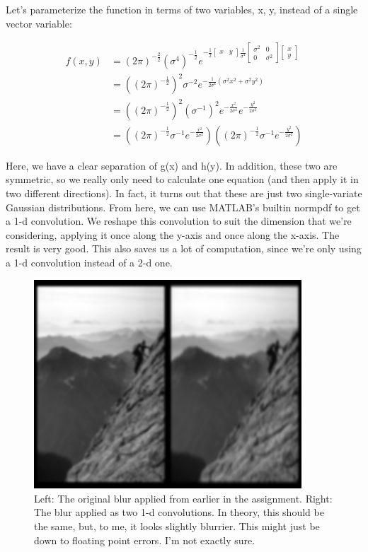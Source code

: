 \documentclass{article}
\begin{document}
Let's parameterize the function in terms of two variables, x, y, instead of a 
single vector variable:

\begin{align*}
f(x, y) &= (2 \pi)^{-\frac{2}{2}} (\sigma^4)^{-\frac{1}{2}} e^{-\frac{1}{2} \begin{bmatrix} x & y \end{bmatrix} \frac{1}{\sigma^4} \begin{bmatrix}
            \sigma^2 &        0 \\
                   0 & \sigma^2
        \end{bmatrix} \begin{bmatrix} x \\ y \end{bmatrix}} \\
        &= ((2 \pi)^{-\frac{1}{2}})^2 \sigma^{-2} e^{-\frac{1}{2 \sigma^4} (\sigma^2 x^2 + \sigma ^2 y^2)} \\
        &= ((2 \pi)^{-\frac{1}{2}})^2 (\sigma^{-1})^2 e^{-\frac{x^2}{2 \sigma^2}} e^{-\frac{y^2}{2 \sigma^2}} \\
        &= ((2 \pi)^{-\frac{1}{2}} \sigma^{-1} e^{-\frac{x^2}{2 \sigma^2}}) ((2 \pi)^{-\frac{1}{2}} \sigma^{-1} e^{-\frac{y^2}{2 \sigma^2}})
\end{align*}

Here, we have a clear separation of g(x) and h(y). In addition, these two are 
symmetric, so we really only need to calculate one equation (and then apply it in two different directions). In fact, it turns out that these 
are just two single-variate Gaussian distributions. From here, we can use MATLAB's 
builtin normpdf to get a 1-d convolution. We reshape this convolution to suit the 
dimension that we're considering, applying it once along the y-axis and once 
along the x-axis. The result is very good. This also saves us a lot of 
computation, since we're only using a 1-d convolution instead of a 2-d one.

\begin{figure}[!ht]
	\centering
	\includegraphics[width=100mm]{figs/2d_vs_2x_1d_blurs.png}
	\caption{Left: The original blur applied from earlier in the assignment. 
        Right: The blur applied as two 1-d convolutions. In theory, this should 
        be the same, but, to me, it looks slightly blurrier. This might just be 
        down to floating point errors. I'm not exactly sure.}
\end{figure}
\end{document}

